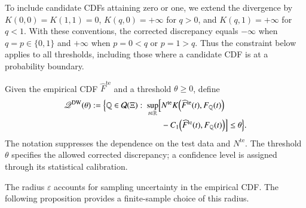 \documentclass[review,11pt,3p,authoryear,nopreprintline]{elsarticle}
\begin{document}
To include candidate CDFs attaining zero or one, we extend the divergence by $K(0,0)=K(1,1)=0$, $K(q,0)=+\infty$ for $q>0$, and $K(q,1)=+\infty$ for $q<1$. With these conventions, the corrected discrepancy equals $-\infty$ when $q=p\in\{0,1\}$ and $+\infty$ when $p=0<q$ or $p=1>q$. Thus the constraint below applies to all thresholds, including those where a candidate CDF is at a probability boundary.

\begin{definition}
  \label{definition-dw-ambiguity-set}
  Given the empirical CDF $\widehat F^{\mathrm{te}}$ and a threshold $\theta\ge0$, define
  \begin{equation}
    \begin{aligned}
      \mathscr Q^{\mathrm{DW}}(\theta):=\Bigl\{\mathbb Q\in\mathcal Q(\Xi):\ 
      \sup_{t\in\mathbb R}\Bigl[&N^{\mathrm{te}}K\!\left(\widehat F^{\mathrm{te}}(t),F_{\mathbb Q}(t)\right)\\
      &{}-C_1\!\left(\widehat F^{\mathrm{te}}(t),F_{\mathbb Q}(t)\right)\Bigr]\le\theta\Bigr\}.
    \end{aligned}
    \label{eq-cdf-ambiguity-set}
  \end{equation}
  The notation suppresses the dependence on the test data and $N^{\mathrm{te}}$. The threshold $\theta$ specifies the allowed corrected discrepancy; a confidence level is assigned through its statistical calibration.
\end{definition}

The radius $\varepsilon$ accounts for sampling uncertainty in the empirical CDF. The following proposition provides a finite-sample choice of this radius.
\end{document}
